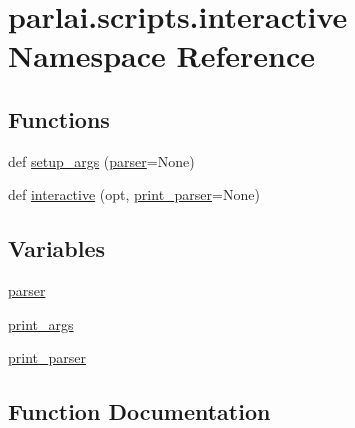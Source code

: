 \hypertarget{namespaceparlai_1_1scripts_1_1interactive}{}\section{parlai.\+scripts.\+interactive Namespace Reference}
\label{namespaceparlai_1_1scripts_1_1interactive}
\subsection*{Functions}
\begin{DoxyCompactItemize}
\item 
def \hyperlink{namespaceparlai_1_1scripts_1_1interactive_a873c4ae402aee061884a22139a5a442f}{setup\+\_\+args} (\hyperlink{namespaceparlai_1_1scripts_1_1interactive_aa65512f9bcb75fc7836cd2aea89c9dc3}{parser}=None)
\item 
def \hyperlink{namespaceparlai_1_1scripts_1_1interactive_aae322ec752aa32b1304870833db25f13}{interactive} (opt, \hyperlink{namespaceparlai_1_1scripts_1_1interactive_a680885c6952e73c13d84a76689b5822d}{print\+\_\+parser}=None)
\end{DoxyCompactItemize}
\subsection*{Variables}
\begin{DoxyCompactItemize}
\item 
\hyperlink{namespaceparlai_1_1scripts_1_1interactive_aa65512f9bcb75fc7836cd2aea89c9dc3}{parser}
\item 
\hyperlink{namespaceparlai_1_1scripts_1_1interactive_ac6217b28a10046284cecb3bbe3d8a4ce}{print\+\_\+args}
\item 
\hyperlink{namespaceparlai_1_1scripts_1_1interactive_a680885c6952e73c13d84a76689b5822d}{print\+\_\+parser}
\end{DoxyCompactItemize}


\subsection{Function Documentation}
\mbox{\label{namespaceparlai_1_1scripts_1_1interactive_aae322ec752aa32b1304870833db25f13}} 
